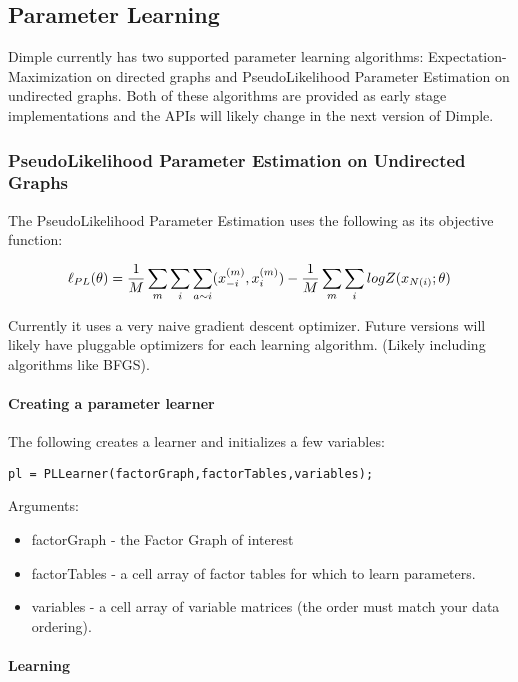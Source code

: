 \subsection{Parameter Learning}

Dimple currently has two supported parameter learning algorithms: Expectation-Maximization on directed graphs and PseudoLikelihood Parameter Estimation on undirected graphs.  Both of these algorithms are provided as early stage implementations and the APIs will likely change in the next version of Dimple.

\subsubsection{PseudoLikelihood Parameter Estimation on Undirected Graphs}

The PseudoLikelihood Parameter Estimation uses the following as its objective function:

\[
\ell_{PL}(\theta) = \frac{1}{M}\sum_m \sum_i \sum_{a \sim  i} (x_{-i}^{(m)},x_i^{(m)}) - \\
\frac{1}{M} \sum_m \sum_i log Z(x_{N(i)};\theta)
\]

Currently it uses a very naive gradient descent optimizer.  Future versions will likely have pluggable optimizers for each learning algorithm.  (Likely including algorithms like BFGS).

\paragraph{Creating a parameter learner}

The following creates a learner and initializes a few variables:

\begin{lstlisting}
pl = PLLearner(factorGraph,factorTables,variables);
\end{lstlisting}

Arguments:
\begin{itemize}
\item factorGraph - the Factor Graph of interest
\item factorTables - a cell array of factor tables for which to learn parameters.
\item variables - a cell array of variable matrices (the order must match your data ordering).
\end{itemize}

\paragraph{Learning}

